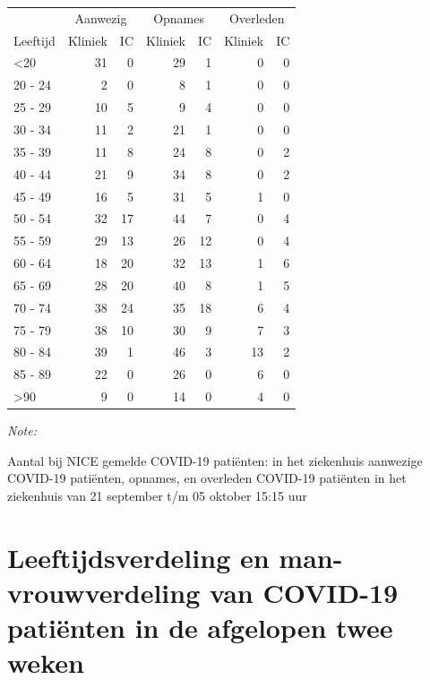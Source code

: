 \documentclass[
  english,
  man,floatsintext]{apa6}
\begin{document}
\begin{table}
\centering\begingroup\fontsize{10}{12}\selectfont

\begin{threeparttable}
\begin{tabular}{lrrrrrr}
\toprule
\multicolumn{1}{c}{ } & \multicolumn{2}{c}{Aanwezig} & \multicolumn{2}{c}{Opnames} & \multicolumn{2}{c}{Overleden} \\
\cmidrule(l{3pt}r{3pt}){2-3} \cmidrule(l{3pt}r{3pt}){4-5} \cmidrule(l{3pt}r{3pt}){6-7}
Leeftijd & Kliniek & IC & Kliniek & IC & Kliniek & IC\\
\midrule
<20 & 31 & 0 & 29 & 1 & 0 & 0\\
20 - 24 & 2 & 0 & 8 & 1 & 0 & 0\\
25 - 29 & 10 & 5 & 9 & 4 & 0 & 0\\
30 - 34 & 11 & 2 & 21 & 1 & 0 & 0\\
35 - 39 & 11 & 8 & 24 & 8 & 0 & 2\\
40 - 44 & 21 & 9 & 34 & 8 & 0 & 2\\
45 - 49 & 16 & 5 & 31 & 5 & 1 & 0\\
50 - 54 & 32 & 17 & 44 & 7 & 0 & 4\\
55 - 59 & 29 & 13 & 26 & 12 & 0 & 4\\
60 - 64 & 18 & 20 & 32 & 13 & 1 & 6\\
65 - 69 & 28 & 20 & 40 & 8 & 1 & 5\\
70 - 74 & 38 & 24 & 35 & 18 & 6 & 4\\
75 - 79 & 38 & 10 & 30 & 9 & 7 & 3\\
80 - 84 & 39 & 1 & 46 & 3 & 13 & 2\\
85 - 89 & 22 & 0 & 26 & 0 & 6 & 0\\
>90 & 9 & 0 & 14 & 0 & 4 & 0\\
\bottomrule
\end{tabular}
\begin{tablenotes}
\item \textit{Note: } 
\item Aantal bij NICE gemelde COVID-19 patiënten: in het ziekenhuis aanwezige COVID-19 patiënten, opnames, en overleden COVID-19 patiënten in het ziekenhuis van 21 september t/m 05 oktober 15:15 uur
\end{tablenotes}
\end{threeparttable}
\endgroup{}
\end{table}

\newpage

\hypertarget{leeftijdsverdeling-en-man-vrouwverdeling-van-covid-19-patiuxebnten-in-de-afgelopen-twee-weken}{%
\section{Leeftijdsverdeling en man-vrouwverdeling van COVID-19 patiënten in de afgelopen twee weken}\label{leeftijdsverdeling-en-man-vrouwverdeling-van-covid-19-patiuxebnten-in-de-afgelopen-twee-weken}}
\end{document}
